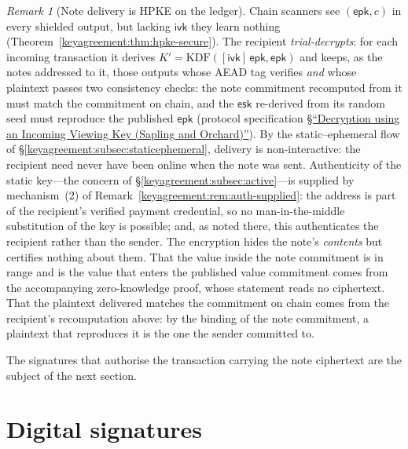 \documentclass[11pt,a4paper]{article}
\theoremstyle{definition}
\theoremstyle{remark}
\newtheorem{remark}[theorem]{Remark}
\begin{document}
\begin{remark}[Note delivery is HPKE on the ledger]
Chain scanners see \((\mathsf{epk}, c)\) in every shielded output,
but lacking \(\mathsf{ivk}\) they learn nothing
(Theorem~\ref{keyagreement:thm:hpke-secure}). The recipient
\emph{trial-decrypts}: for each incoming transaction it derives
\(K' = \mathrm{KDF}([\mathsf{ivk}]\,\mathsf{epk}, \mathsf{epk})\)
and keeps, as the notes addressed to it, those outputs whose AEAD tag
verifies \emph{and} whose plaintext passes two consistency checks: the
note commitment recomputed from it must match the commitment on chain,
and the \(\mathsf{esk}\) re-derived from its random seed must
reproduce the published \(\mathsf{epk}\) (protocol specification
\href{https://zips.z.cash/protocol/protocol.pdf\#decryptivk}{\S``Decryption using
an Incoming Viewing Key (Sapling and Orchard)''}).
By the static--ephemeral flow of
\S\ref{keyagreement:subsec:staticephemeral}, delivery is
non-interactive: the recipient need never have been online when the
note was sent. Authenticity of the
static key---the concern of \S\ref{keyagreement:subsec:active}---is
supplied by mechanism~(2) of
Remark~\ref{keyagreement:rem:auth-supplied}: the address is part of
the recipient's verified payment credential, so no
man-in-the-middle substitution of the key is possible; and, as noted
there, this authenticates the recipient rather than the sender. The
encryption hides the note's \emph{contents} but certifies nothing about
them. That the value inside the note commitment is in range and is the
value that enters the published value commitment comes from the accompanying
zero-knowledge proof, whose statement reads no ciphertext. That the
plaintext delivered matches the commitment on chain comes from the
recipient's recomputation above: by the binding of the note commitment,
a plaintext that reproduces it is the one the sender committed to.
\end{remark}

The signatures that authorise the transaction carrying the note
ciphertext are the subject of the next section.

\section{Digital signatures}\label{sec:signatures}
\end{document}
